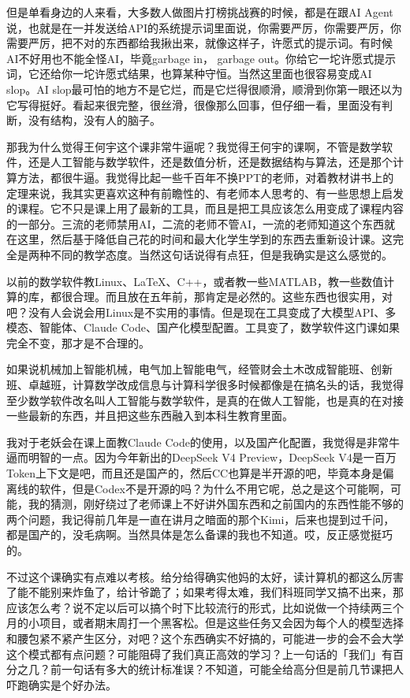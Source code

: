 但是单看身边的人来看，大多数人做图片打榜挑战赛的时候，都是在跟AI Agent说，也就是在一并发送给API的系统提示词里面说，你需要严厉，你需要严厉，你需要严厉，把不对的东西都给我揪出来，就像这样子，许愿式的提示词。有时候AI不好用也不能全怪AI，毕竟garbage in， garbage out。你给它一坨许愿式提示词，它还给你一坨许愿式结果，也算某种守恒。当然这里面也很容易变成AI slop。AI slop最可怕的地方不是它烂，而是它烂得很顺滑，顺滑到你第一眼还以为它写得挺好。看起来很完整，很丝滑，很像那么回事，但仔细一看，里面没有判断，没有结构，没有人的脑子。

那我为什么觉得王何宇这个课非常牛逼呢？我觉得王何宇的课啊，不管是数学软件，还是人工智能与数学软件，还是数值分析，还是数据结构与算法，还是那个计算方法，都很牛逼。我觉得比起一些千百年不换PPT的老师，对着教材讲书上的定理来说，我其实更喜欢这种有前瞻性的、有老师本人思考的、有一些思想上启发的课程。它不只是课上用了最新的工具，而且是把工具应该怎么用变成了课程内容的一部分。三流的老师禁用AI，二流的老师不管AI，一流的老师知道这个东西就在这里，然后基于降低自己花的时间和最大化学生学到的东西去重新设计课。这完全是两种不同的教学态度。当然这句话说得有点狂，但是我确实是这么感觉的。

以前的数学软件教Linux、LaTeX、C++，或者教一些MATLAB，教一些数值计算的库，都很合理。而且放在五年前，那肯定是必然的。这些东西也很实用，对吧？没有人会说会用Linux是不实用的事情。但是现在工具变成了大模型API、多模态、智能体、Claude Code、国产化模型配置。工具变了，数学软件这门课如果完全不变，那才是不合理的。

如果说机械加上智能机械，电气加上智能电气，经管财会土木改成智能班、创新班、卓越班，计算数学改成信息与计算科学很多时候都像是在搞名头的话，我觉得至少数学软件改名叫人工智能与数学软件，是真的在做人工智能，也是真的在对接一些最新的东西，并且把这些东西融入到本科生教育里面。

我对于老妖会在课上面教Claude Code的使用，以及国产化配置，我觉得是非常牛逼而明智的一点。因为今年新出的DeepSeek V4 Preview，DeepSeek V4是一百万Token上下文是吧，而且还是国产的，然后CC也算是半开源的吧，毕竟本身是偏离线的软件，但是Codex不是开源的吗？为什么不用它呢，总之是这个可能啊，可能，我的猜测，刚好绕过了老师课上不好讲外国东西和之前国内的东西性能不够的两个问题，我记得前几年是一直在讲月之暗面的那个Kimi，后来也提到过千问，都是国产的，没毛病啊。当然具体是怎么备课的我也不知道。哎，反正感觉挺巧的。

不过这个课确实有点难以考核。给分给得确实他妈的太好，读计算机的都这么厉害了能不能别来炸鱼了，给计爷跪了；如果考得太难，我们科班同学又搞不出来，那应该怎么考？说不定以后可以搞个时下比较流行的形式，比如说做一个持续两三个月的小项目，或者期末周打一个黑客松。但是这些任务又会因为每个人的模型选择和腰包紧不紧产生区分，对吧？这个东西确实不好搞的，可能进一步的会不会大学这个模式都有点问题？可能阻碍了我们真正高效的学习？上一句话的「我们」有百分之几？前一句话有多大的统计标准误？不知道，可能全给高分但是前几节课把人吓跑确实是个好办法。

